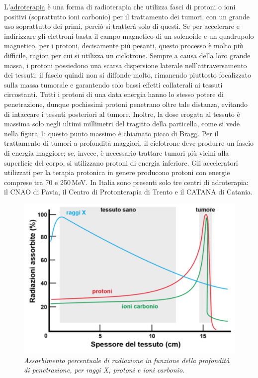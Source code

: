 \documentclass{report}
\newcommand{\figref}[1]{figura \ref{#1}}
\numberwithin{equation}{section}
\numberwithin{figure}{section}
\begin{document}
L'\underline{adroterapia} è una forma di radioterapia che utilizza fasci di protoni o ioni positivi (soprattutto ioni carbonio) per il trattamento dei tumori, con un grande uso soprattutto dei primi, perciò si tratterà solo di questi. Se per accelerare e indirizzare gli elettroni basta il campo magnetico di un solenoide e un quadrupolo magnetico, per i protoni, decisamente più pesanti, questo processo è molto più difficile, ragion per cui si utilizza un ciclotrone. Sempre a causa della loro grande massa, i protoni possiedono una scarsa dispersione laterale nell'attraversamento dei tessuti; il fascio quindi non si diffonde molto, rimanendo piuttosto focalizzato sulla massa tumorale e garantendo solo bassi effetti collaterali ai tessuti circostanti. Tutti i protoni di una data energia hanno lo stesso potere di penetrazione, dunque pochissimi protoni penetrano oltre tale distanza, evitando di intaccare i tessuti posteriori al tumore. Inoltre, la dose erogata al tessuto è massima solo negli ultimi millimetri del tragitto della particella, come si vede nella \figref{fig:adroterapia}: questo punto massimo è chiamato picco di Bragg. Per il trattamento di tumori a profondità maggiori, il ciclotrone deve produrre un fascio di energia maggiore; se, invece, è necessario trattare tumori più vicini alla superficie del corpo, si utilizzano protoni di energia inferiore. Gli acceleratori utilizzati per la terapia protonica in genere producono protoni con energie comprese tra 70 e 250\,MeV. In Italia sono presenti solo tre centri di adroterapia: il CNAO di Pavia, il Centro di Protonterapia di Trento e il CATANA di Catania.

\begin{figure}[htp]
\centering
\includegraphics[scale=0.82]{immagini/adroterapia.png}
\caption{\label{fig:adroterapia} \textit{Assorbimento percentuale di radiazione in funzione della profondità di penetrazione, per raggi X, protoni e ioni carbonio}.}
\end{figure}
\end{document}
